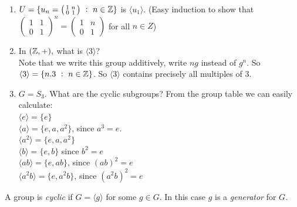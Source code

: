 \documentclass[10pt]{scrartcl}
\begin{document}
\begin{examples} \begin{enumerate}
 \item $U = \{u_n = \left(\begin{smallmatrix}
1 & n \\ 0 & 1	
\end{smallmatrix}\right) ~:~ n \in \mathbb{Z}
\}$	is $\langle u_1 \rangle $. (Easy induction to show that $\left(\begin{smallmatrix}
1 & 1 \\ 0 & 1	
\end{smallmatrix}\right)^n = \left(\begin{smallmatrix}
1 & n \\ 0 & 1	
\end{smallmatrix}\right)$ for all $n \in Z$)
\item In $(\mathbb{Z},+),$ what is $\langle 3 \rangle $?\\
Note that we write this group additively, write $ng$ instead of $g^n$. So $\langle 3 \rangle = \{n.3 ~:~ n \in \mathbb{Z}\}$. So $\langle 3 \rangle$ contains precisely all multiples of 3.
\item $G = S_3$. What are the cyclic subgroups? From the group table we can easily calculate:\\\vspace{5pt}
$\langle e \rangle = \{e\}$\\ \vspace{5pt}
$\langle a \rangle = \{e,a,a^2\}$, since $a^3 = e$.\\\vspace{5pt}
$\langle a^2 \rangle = \{e,a,a^2\}$\\\vspace{5pt}
$\langle b\rangle = \{e,b\}$ since $b^2 = e$\\\vspace{5pt}
$\langle ab \rangle = \{e,ab\}$, since $(ab)^2 = e$\\\vspace{5pt}
$\langle a^2b \rangle = \{e,a^2b\}$, since $(a^2b)^2 = e$\\
 \end{enumerate}
 \end{examples}\vspace*{5pt}
 

\begin{definition}   
A group is \emph{cyclic} if $G = \langle g \rangle $ for some $g \in G$. In this case $g$ is a \emph{generator} for $G$.
	
\end{definition}
\end{document}
